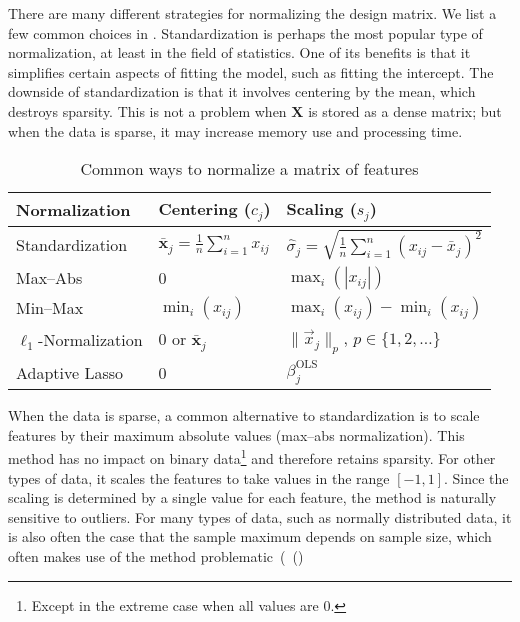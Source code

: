 There are many different strategies for normalizing the design matrix. We list a few common
choices in . Standardization is perhaps the most popular type
of normalization, at least in the field of statistics. One of its benefits is that it
simplifies certain aspects of fitting the model, such as fitting the intercept. The
downside of standardization is that it involves centering by the mean, which destroys
sparsity. This is not a problem when \(\bm{X}\) is stored as a dense matrix; but when the
data is sparse, it may increase memory use and processing time.

\begin{table}[hbt]
  \centering
  \caption{Common ways to normalize a matrix of features}
  \label{tab:normalization-types}
  \begin{tabular}{lll}
    \toprule
    Normalization            & Centering (\(c_{j}\))                               & Scaling (\(s_j\))                                                          \\
    \midrule
    Standardization          & \(\bar{\bm{x}}_j = \frac{1}{n}\sum_{i=1}^n x_{ij}\) & \(\hat{\sigma}_j = \sqrt{\frac{1}{n}\sum_{i=1}^n (x_{ij} - \bar{x}_j)^2}\) \\
    \addlinespace
    Max--Abs                 & 0                                                   & \(\max_i(|x_{ij}|)\)                                                       \\
    \addlinespace
    Min--Max                 & \(\min_i(x_{ij})\)                                  & \(\max_i(x_{ij}) - \min_i(x_{ij})\)                                        \\
    \addlinespace
    \(\ell_1\)-Normalization & 0 or \(\bm{\bar{x}}_j\)                             & \(\lVert \vec{x}_j\rVert_p\), \(p \in \{1,2,\dots\}\)                      \\
    \addlinespace
    Adaptive Lasso           & 0                                                   & \(\beta_j^\text{OLS}\)                                                     \\
    \bottomrule
  \end{tabular}
\end{table}

When the data is sparse, a common alternative to standardization is to scale features by
their maximum absolute values (max--abs normalization). This method has no impact on binary
data\footnote{Except in the extreme case when all values are 0.} and therefore retains
sparsity. For other types of data, it scales the features to take values in the range
\([-1, 1]\). Since the scaling is determined by a single value for each feature, the method
is naturally sensitive to outliers. For many types of data, such as normally distributed
data, it is also often the case that the sample maximum depends on sample size, which often
makes use of the method problematic~(~()

